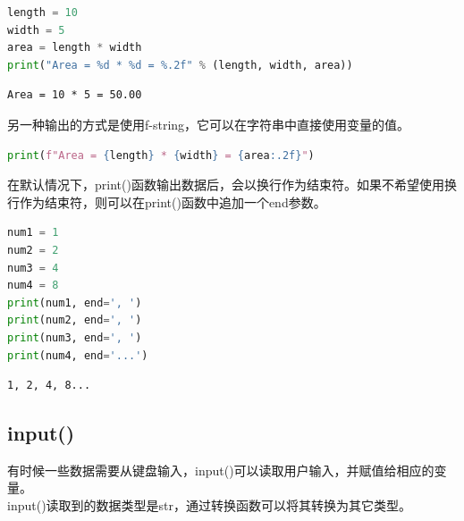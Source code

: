 \vspace{0.5cm}


\begin{lstlisting}[language=Python]
length = 10
width = 5
area = length * width
print("Area = %d * %d = %.2f" % (length, width, area))
\end{lstlisting}

\begin{tcolorbox}
	\begin{verbatim}
Area = 10 * 5 = 50.00
	\end{verbatim}
\end{tcolorbox}

另一种输出的方式是使用f-string，它可以在字符串中直接使用变量的值。

\vspace{-0.5cm}

\begin{lstlisting}[language=Python]
print(f"Area = {length} * {width} = {area:.2f}")
\end{lstlisting}

在默认情况下，print()函数输出数据后，会以换行作为结束符。如果不希望使用换行作为结束符，则可以在print()函数中追加一个end参数。\\


\begin{lstlisting}[language=Python]
num1 = 1
num2 = 2
num3 = 4
num4 = 8
print(num1, end=', ')
print(num2, end=', ')
print(num3, end=', ')
print(num4, end='...')
\end{lstlisting}

\begin{tcolorbox}
	\begin{verbatim}
1, 2, 4, 8...
\end{verbatim}
\end{tcolorbox}

\vspace{0.5cm}

\subsection{input()}

有时候一些数据需要从键盘输入，input()可以读取用户输入，并赋值给相应的变量。\\

input()读取到的数据类型是str，通过转换函数可以将其转换为其它类型。\\

